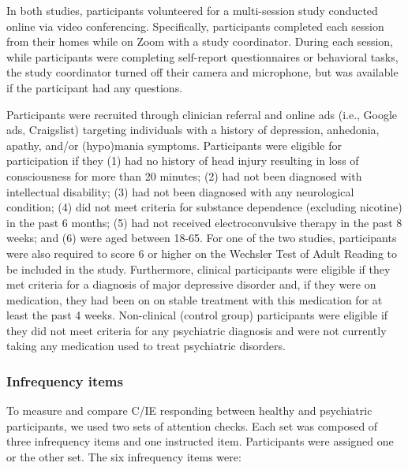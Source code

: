 \documentclass[a4paper,notitlepage,12pt]{article}
\begin{document}
\begin{refsection}[supp]
In both studies, participants volunteered for a multi-session study conducted online via video conferencing. Specifically, participants completed each session from their homes while on Zoom with a study coordinator. During each session, while participants were completing self-report questionnaires or behavioral tasks, the study coordinator turned off their camera and microphone, but was available if the participant had any questions. 

Participants were recruited through clinician referral and online ads (i.e., Google ads, Craigslist) targeting individuals with a history of depression, anhedonia, apathy, and/or (hypo)mania symptoms. Participants were eligible for participation if they (1) had no history of head injury resulting in loss of consciousness for more than 20 minutes; (2) had not been diagnosed with intellectual disability; (3) had not been diagnosed with any neurological condition; (4) did not meet criteria for substance dependence (excluding nicotine) in the past 6 months; (5) had not received electroconvulsive therapy in the past 8 weeks; and (6) were aged between 18-65. For one of the two studies, participants were also required to score 6 or higher on the Wechsler Test of Adult Reading to be included in the study. Furthermore, clinical participants were eligible if they met criteria for a diagnosis of major depressive disorder and, if they were on medication, they had been on on stable treatment with this medication for at least the past 4 weeks. Non-clinical (control group) participants were eligible if they did not meet criteria for any psychiatric diagnosis and were not currently taking any medication used to treat psychiatric disorders.

\subsubsection*{Infrequency items}

To measure and compare C/IE responding between healthy and psychiatric participants, we used two sets of attention checks. Each set was composed of three infrequency items and one instructed item. Participants were assigned one or the other set. The six infrequency items were:


\end{refsection}
\end{document}
